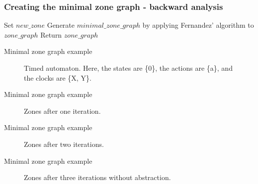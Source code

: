 \documentclass{beamer}
\begin{document}
\begin{frame}[fragile, shrink=20]
  \frametitle{Creating the minimal zone graph - backward analysis}

  \begin{algorithm2e}[H]
    Set $new\_zone$\;
    Generate $minimal\_zone\_graph$ by applying Fernandez' algorithm to $zone\_graph$\;
    Return $zone\_graph$\;
  \end{algorithm2e}

\end{frame}

\begin{frame}{Minimal zone graph example}
  \begin{figure}
    \centering
    \def\svgwidth{0.6\columnwidth}
    
    \caption{Timed automaton. Here, the states are \{0\}, the actions
      are \{a\}, and the clocks are \{X, Y\}.}
  \end{figure}
\end{frame}

\begin{frame}{Minimal zone graph example}
  \begin{figure}
    \centering
    \def\svgwidth{0.4\columnwidth}
    
    \caption{Zones after one iteration.}
  \end{figure}
\end{frame}

\begin{frame}[shrink=20]{Minimal zone graph example}
  \begin{figure}
    \centering
    \def\svgwidth{0.7\columnwidth}
    
    \caption{Zones after two iterations.}
  \end{figure}
\end{frame}

\begin{frame}[shrink=20]{Minimal zone graph example}
  \begin{figure}
    \centering
    \def\svgwidth{0.9\columnwidth}
    
    \caption{Zones after three iterations without abstraction.}
  \end{figure}
\end{frame}
\end{document}

